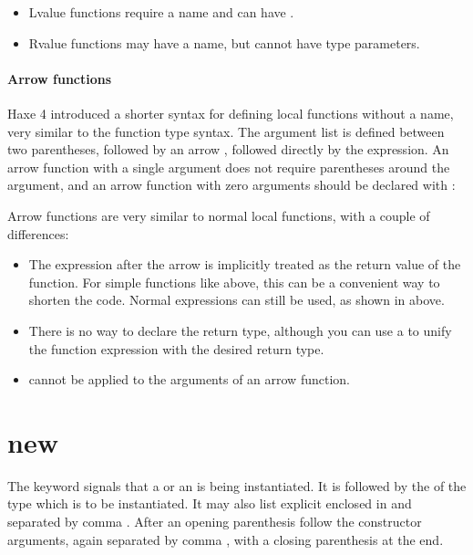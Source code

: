 \begin{itemize}
	\item Lvalue functions require a name and can have .
	\item Rvalue functions may have a name, but cannot have type parameters.
\end{itemize}


\label{expression-arrow-function}
\paragraph{Arrow functions}

Haxe 4 introduced a shorter syntax for defining local functions without a name, very similar to the function type syntax. The argument list is defined between two parentheses, followed by an arrow \expr{->}, followed directly by the expression. An arrow function with a single argument does not require parentheses around the argument, and an arrow function with zero arguments should be declared with :


Arrow functions are very similar to normal local functions, with a couple of differences:

\begin{itemize}
	\item The expression after the arrow is implicitly treated as the return value of the function. For simple functions like  above, this can be a convenient way to shorten the code. Normal  expressions can still be used, as shown in  above.
	\item There is no way to declare the return type, although you can use a  to unify the function expression with the desired return type.
	\item {} cannot be applied to the arguments of an arrow function.
\end{itemize}


\section{new}
\label{expression-new}

The  keyword signals that a  or an  is being instantiated. It is followed by the  of the type which is to be instantiated. It may also list explicit  enclosed in \expr{<>} and separated by comma \expr{,}. After an opening parenthesis \expr{(} follow the constructor arguments, again separated by comma \expr{,}, with a closing parenthesis \expr{)} at the end.

